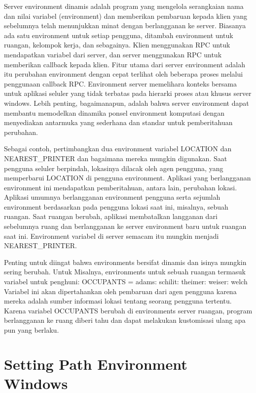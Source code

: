 \begin{itemize}
Server environment dinamis adalah program yang mengelola serangkaian nama dan nilai variabel (environment) dan memberikan pembaruan kepada klien yang sebelumnya telah menunjukkan minat dengan berlangganan ke server. Biasanya ada satu environment untuk setiap pengguna, ditambah environment untuk ruangan, kelompok kerja, dan sebagainya. Klien menggunakan RPC untuk mendapatkan variabel dari server, dan server menggunakan RPC untuk memberikan callback kepada klien. Fitur utama dari server environment adalah itu perubahan environment dengan cepat terlihat oleh beberapa proses melalui penggunaan callback RPC. Environment server memelihara konteks bersama untuk aplikasi seluler yang tidak terbatas pada hierarki proses atau khusus server windows. Lebih penting, bagaimanapun, adalah bahwa server environment dapat membantu memodelkan dinamika ponsel environment komputasi dengan menyediakan antarmuka yang sederhana dan standar untuk pemberitahuan perubahan.

Sebagai contoh, pertimbangkan dua environment variabel LOCATION dan NEAREST_PRINTER dan bagaimana mereka mungkin digunakan. Saat pengguna seluler berpindah, lokasinya dilacak oleh agen pengguna, yang memperbarui LOCATION di pengguna environment. Aplikasi yang berlangganan environment ini mendapatkan pemberitahuan, antara lain, perubahan lokasi.
Aplikasi umumnya berlangganan environment pengguna serta sejumlah environment berdasarkan pada pengguna lokasi saat ini, misalnya, sebuah ruangan. Saat ruangan berubah, aplikasi membatalkan langganan dari sebelumnya ruang dan berlangganan ke server environment baru untuk ruangan saat ini. Environment variabel di server semacam itu mungkin menjadi NEAREST_PRINTER.

Penting untuk diingat bahwa environments bersifat dinamis dan isinya mungkin sering berubah. Untuk Misalnya, environments untuk sebuah ruangan termasuk variabel untuk penghuni:
OCCUPANTS = adams: schilit: theimer: weiser: welch 
Variabel ini akan dipertahankan oleh pembaruan dari agen pengguna karena mereka adalah sumber informasi lokasi tentang seorang pengguna tertentu. Karena variabel OCCUPANTS berubah di environments server ruangan, program berlangganan ke ruang diberi tahu dan dapat melakukan kustomisasi ulang apa pun yang berlaku.
\cite{schilit1993customizing}


\section {Setting Path Environment Windows}


\end{itemize}
